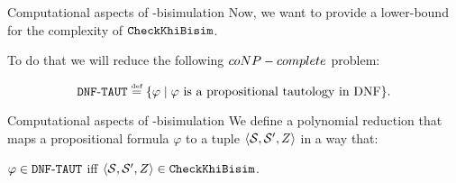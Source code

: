 \documentclass{beamer}
\begin{document}
\begin{frame}{Computational aspects of \KHilogic-bisimulation}
    Now, we want to provide a lower-bound for the complexity of $\mathtt{CheckKhiBisim}$.\pause

    To do that we will reduce the following ${coNP-complete}$ problem:\pause

    \begin{definition}
        \[ 
            \dnftautpb \eqdef \set{\varphi \mid \varphi \text{ is a propositional tautology in DNF}}.
        \]
    \end{definition}
\end{frame}


\begin{frame}{Computational aspects of \KHilogic-bisimulation}
    We define a polynomial reduction that maps a propositional formula $\varphi$ to a tuple $\langle \mathcal{S},\mathcal{S}',Z \rangle$ 
    in a way that:\pause 
    \begin{center}
        $\varphi\in\mathtt{DNF{\text{-}}TAUT}$ iff $\langle \mathcal{S},\mathcal{S}',Z \rangle\in\mathtt{CheckKhiBisim}$.
    \end{center}
\end{frame}
\end{document}
